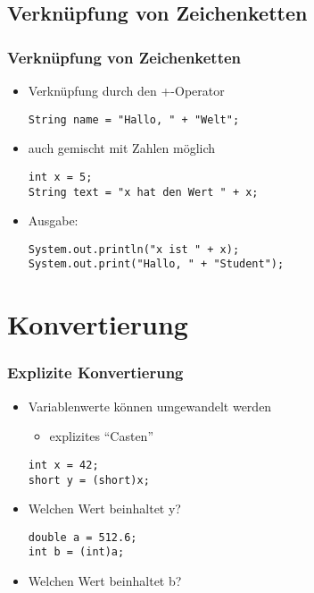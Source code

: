 \documentclass[final]{beamer}
\begin{document}
\subsection{Verknüpfung von Zeichenketten}
\begin{frame}[fragile]
  \frametitle{Verknüpfung von Zeichenketten}
  \begin{itemize}
    \item Verknüpfung durch den +-Operator
    \begin{lstlisting}[morekeywords={type,String}]
String name = "Hallo, " + "Welt";
    \end{lstlisting}
    \item auch gemischt mit Zahlen möglich
    \begin{lstlisting}
int x = 5;
String text = "x hat den Wert " + x;
    \end{lstlisting}
    \item Ausgabe:
    \begin{lstlisting}
System.out.println("x ist " + x);
System.out.print("Hallo, " + "Student");
    \end{lstlisting}
  \end{itemize}
\end{frame}

\section{Konvertierung}
\begin{frame}[fragile]
  \frametitle{Explizite Konvertierung}
  \begin{itemize}
    \item Variablenwerte können umgewandelt werden 
    \begin{itemize}
      \item explizites "`Casten"'
    \end{itemize}
    \begin{lstlisting}
int x = 42;
short y = (short)x;
    \end{lstlisting}
    \item[] Welchen Wert beinhaltet y? \qquad {}
    \begin{lstlisting}
double a = 512.6;
int b = (int)a;
    \end{lstlisting}
    \item[] Welchen Wert beinhaltet b? \qquad {}
  \end{itemize}
\end{frame}
\end{document}
